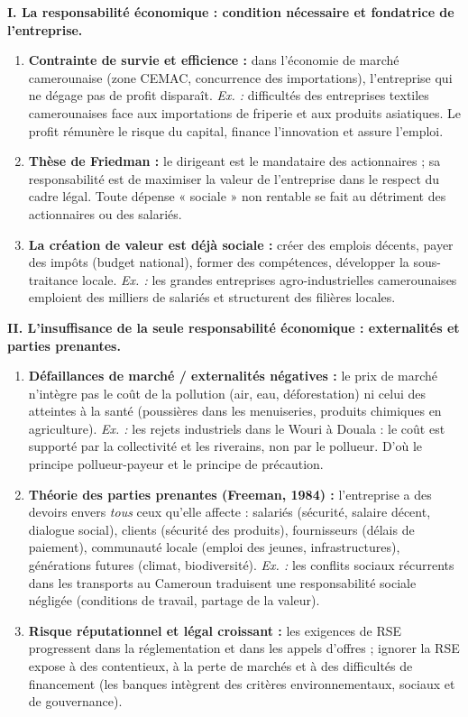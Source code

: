 \documentclass[11pt]{article}
\newcommand{\cle}[1]{{\popxbold\color{popdark}#1}}
\begin{document}
\begin{exoresolu}
    \textbf{I. La responsabilité économique : condition nécessaire et fondatrice de l'entreprise.}
    \begin{enumerate}
        \item \textbf{Contrainte de survie et efficience :} dans l'économie de marché camerounaise (zone CEMAC, concurrence des importations), l'entreprise qui ne dégage pas de profit disparaît. \emph{Ex. :} difficultés des entreprises textiles camerounaises face aux importations de friperie et aux produits asiatiques. Le profit rémunère le risque du capital, finance l'innovation et assure l'emploi.
        \item \textbf{Thèse de Friedman :} le dirigeant est le mandataire des actionnaires ; sa responsabilité est de maximiser la valeur de l'entreprise dans le respect du cadre légal. Toute dépense « sociale » non rentable se fait au détriment des actionnaires ou des salariés.
        \item \textbf{La création de valeur est déjà sociale :} créer des emplois décents, payer des impôts (budget national), former des compétences, développer la sous-traitance locale. \emph{Ex. :} les grandes entreprises agro-industrielles camerounaises emploient des milliers de salariés et structurent des filières locales.
    \end{enumerate}

    \textbf{II. L'insuffisance de la seule responsabilité économique : externalités et parties prenantes.}
    \begin{enumerate}
        \item \textbf{Défaillances de marché / externalités négatives :} le prix de marché n'intègre pas le coût de la pollution (air, eau, déforestation) ni celui des atteintes à la santé (poussières dans les menuiseries, produits chimiques en agriculture). \emph{Ex. :} les rejets industriels dans le Wouri à Douala : le coût est supporté par la collectivité et les riverains, non par le pollueur. D'où le principe \cle{pollueur-payeur} et le principe de précaution.
        \item \textbf{Théorie des parties prenantes (Freeman, 1984) :} l'entreprise a des devoirs envers \emph{tous} ceux qu'elle affecte : salariés (sécurité, salaire décent, dialogue social), clients (sécurité des produits), fournisseurs (délais de paiement), communauté locale (emploi des jeunes, infrastructures), générations futures (climat, biodiversité). \emph{Ex. :} les conflits sociaux récurrents dans les transports au Cameroun traduisent une responsabilité sociale négligée (conditions de travail, partage de la valeur).
        \item \textbf{Risque réputationnel et légal croissant :} les exigences de RSE progressent dans la réglementation et dans les appels d'offres ; ignorer la RSE expose à des contentieux, à la perte de marchés et à des difficultés de financement (les banques intègrent des critères environnementaux, sociaux et de gouvernance).
    \end{enumerate}


\end{exoresolu}
\end{document}
